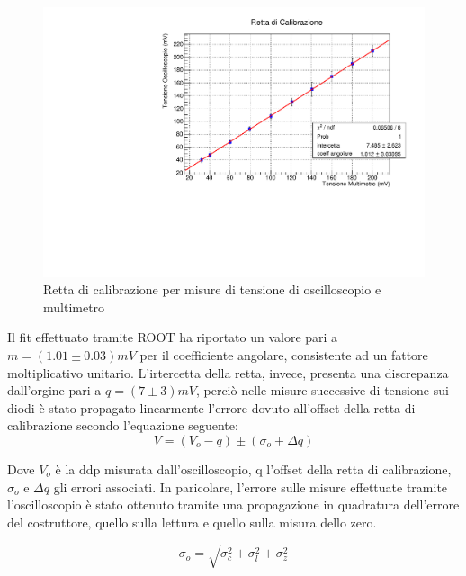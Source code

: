 \documentclass{article}
\begin{document}
\begin{figure}
\centering
\includegraphics[scale=0.15]{calibrazione1.pdf}
\caption{Retta di calibrazione per misure di tensione di oscilloscopio e multimetro} 
\end{figure}
Il fit effettuato tramite ROOT ha riportato un valore pari a \(m=(1.01\pm0.03)mV\) per il coefficiente angolare, consistente ad un fattore moltiplicativo unitario. L’irtercetta della retta, invece, presenta una discrepanza dall’orgine pari a \(q=(7\pm3)mV\), perciò nelle misure successive di tensione sui diodi è stato propagato linearmente l’errore dovuto all’offset della retta di calibrazione secondo l’equazione seguente:
\begin{equation}
V = (V_o - q)\pm(\sigma_o+\Delta q)
\end{equation}

Dove \(V_o\) è la ddp misurata dall’oscilloscopio, q l’offset della retta di calibrazione, \(\sigma_o\) e \(\Delta q\) gli errori associati. In paricolare, l’errore sulle misure effettuate tramite l’oscilloscopio è stato ottenuto tramite una propagazione in quadratura dell’errore del costruttore, quello sulla lettura e quello sulla misura dello zero.

\begin{equation}
\sigma_o = \sqrt{\sigma_c^2+\sigma_l^2+\sigma_z^2}
\end{equation}
\end{document}
